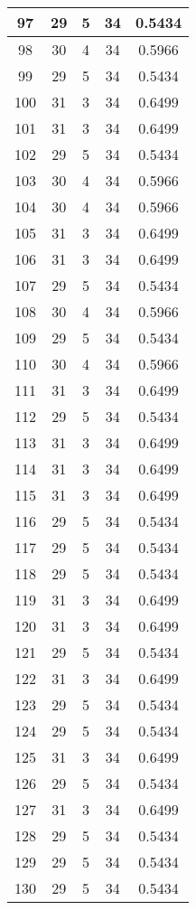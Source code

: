 \documentclass[letterpaper, 12pt]{article}
\begin{document}
\begin{longtable}{|c|c|c|c|c|}
\hline
97 & 29 & 5 & 34 & 0.5434 \\
\hline
98 & 30 & 4 & 34 & 0.5966 \\
\hline
99 & 29 & 5 & 34 & 0.5434 \\
\hline
100 & 31 & 3 & 34 & 0.6499 \\
\hline
101 & 31 & 3 & 34 & 0.6499 \\
\hline
102 & 29 & 5 & 34 & 0.5434 \\
\hline
103 & 30 & 4 & 34 & 0.5966 \\
\hline
104 & 30 & 4 & 34 & 0.5966 \\
\hline
105 & 31 & 3 & 34 & 0.6499 \\
\hline
106 & 31 & 3 & 34 & 0.6499 \\
\hline
107 & 29 & 5 & 34 & 0.5434 \\
\hline
108 & 30 & 4 & 34 & 0.5966 \\
\hline
109 & 29 & 5 & 34 & 0.5434 \\
\hline
110 & 30 & 4 & 34 & 0.5966 \\
\hline
111 & 31 & 3 & 34 & 0.6499 \\
\hline
112 & 29 & 5 & 34 & 0.5434 \\
\hline
113 & 31 & 3 & 34 & 0.6499 \\
\hline
114 & 31 & 3 & 34 & 0.6499 \\
\hline
115 & 31 & 3 & 34 & 0.6499 \\
\hline
116 & 29 & 5 & 34 & 0.5434 \\
\hline
117 & 29 & 5 & 34 & 0.5434 \\
\hline
118 & 29 & 5 & 34 & 0.5434 \\
\hline
119 & 31 & 3 & 34 & 0.6499 \\
\hline
120 & 31 & 3 & 34 & 0.6499 \\
\hline
121 & 29 & 5 & 34 & 0.5434 \\
\hline
122 & 31 & 3 & 34 & 0.6499 \\
\hline
123 & 29 & 5 & 34 & 0.5434 \\
\hline
124 & 29 & 5 & 34 & 0.5434 \\
\hline
125 & 31 & 3 & 34 & 0.6499 \\
\hline
126 & 29 & 5 & 34 & 0.5434 \\
\hline
127 & 31 & 3 & 34 & 0.6499 \\
\hline
128 & 29 & 5 & 34 & 0.5434 \\
\hline
129 & 29 & 5 & 34 & 0.5434 \\
\hline
130 & 29 & 5 & 34 & 0.5434 \\

\end{longtable}
\end{document}
